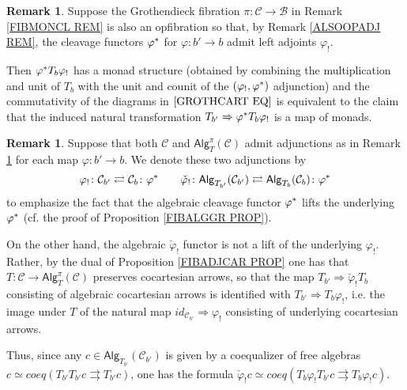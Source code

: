 \documentclass[a4paper,10pt
,draft
]{article}%
\numberwithin{equation}{section}
\numberwithin{figure}{section}
\theoremstyle{definition} %
\newtheorem{remark}[equation]{Remark}%
\newcommand{\1}{\ensuremath{\mathbbm 1}}%
\begin{document}
\begin{remark}\label{ABSPUSH REM}
	Suppose the Grothendieck fibration 
	$\pi \colon \mathcal{C} \to \mathcal{B}$
	in Remark \ref{FIBMONCL REM}
	is also an opfibration so that,
	by Remark \ref{ALSOOPADJ REM},
	the cleavage functors $\varphi^{\**}$ for 
	$\varphi \colon b' \to b$
	admit left adjoints $\varphi_!$.

	Then $\varphi^{\**} T_b \varphi_!$ has a monad structure
	(obtained by combining the multiplication and unit of $T_b$ with the unit and counit of the $(\varphi_!,\varphi^{\**})$ adjunction)
	and the commutativity of the diagrams in $\eqref{GROTHCART EQ}$
      is equivalent to the claim that the induced natural transformation
      $T_{b'} \Rightarrow \varphi^{\**}T_{b}\varphi_{!}$
      is a map of monads.
\end{remark}



\begin{remark}\label{ALGPUSHLL REM}
Suppose that both $\mathcal{C}$ and $\mathsf{Alg}_T^{\pi}(\mathcal{C})$
admit adjunctions as in 
Remark \ref{ABSPUSH REM} for each map $\varphi \colon b' \to b$.
We denote these two adjunctions by
\[
\varphi_! \colon \mathcal{C}_{b'} 
\rightleftarrows
\mathcal{C}_{b}\colon \varphi^{\**}
\qquad
\check{\varphi}_! \colon \mathsf{Alg}_{T_{b'}}(\mathcal{C}_{b'}) 
\rightleftarrows 
\mathsf{Alg}_{T_{b}}(\mathcal{C}_{b})\colon \varphi^{\**}
\]
to emphasize the fact that the algebraic cleavage functor $\varphi^{\**}$ lifts the underlying $\varphi^{\**}$ (cf. the proof of Proposition \ref{FIBALGGR PROP}).


On the other hand, the algebraic $\check{\varphi}_!$ functor is not a lift of
the underlying $\varphi_!$.
Rather, by the dual of Proposition \ref{FIBADJCAR PROP}
one has that $T \colon \mathcal{C} \to \mathsf{Alg}_T^{\pi}(\mathcal{C})$ preserves cocartesian arrows,
so that the map $T_{b'} \Rightarrow \check{\varphi}_! T_{b}$
consisting of algebraic cocartesian arrows
is identified with 
$T_{b'} \Rightarrow T_{b} \varphi_!$,
i.e. the image under $T$
of the natural map
$id_{\mathcal{C}_{b'}} \Rightarrow \varphi_!$
consisting of underlying cocartesian arrows.


Thus, since any 
$c \in \mathsf{Alg}_{T_{b'}}(\mathcal{C}_{b'})$
is given by a coequalizer of free algebras
$c \simeq coeq(T_{b'}T_{b'} c \rightrightarrows T_{b'} c)$,
one has the formula
$\check{\varphi}_! c \simeq 
coeq(T_{b}\varphi_!T_{b'} c \rightrightarrows T_{b}\varphi_! c)$.
\end{remark}
\end{document}
